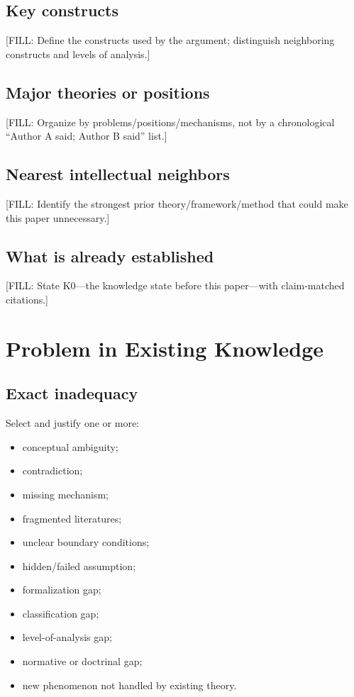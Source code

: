 \documentclass[11pt]{article}
\begin{document}

\subsection{Key constructs}
[FILL: Define the constructs used by the argument; distinguish neighboring
constructs and levels of analysis.]

\subsection{Major theories or positions}
[FILL: Organize by problems/positions/mechanisms, not by a chronological
``Author A said; Author B said'' list.]

\subsection{Nearest intellectual neighbors}
[FILL: Identify the strongest prior theory/framework/method that could make
this paper unnecessary.]

\subsection{What is already established}
[FILL: State K0---the knowledge state before this paper---with claim-matched
citations.]


\section{Problem in Existing Knowledge}
\label{sec:s4}


\subsection{Exact inadequacy}
Select and justify one or more:
\begin{itemize}
  \item conceptual ambiguity;
  \item contradiction;
  \item missing mechanism;
  \item fragmented literatures;
  \item unclear boundary conditions;
  \item hidden/failed assumption;
  \item formalization gap;
  \item classification gap;
  \item level-of-analysis gap;
  \item normative or doctrinal gap;
  \item new phenomenon not handled by existing theory.
\end{itemize}
\end{document}
